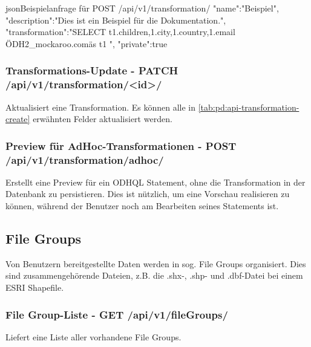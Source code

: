 \begin{srclst}{json}{Beispielanfrage für POST /api/v1/transformation/}
{
  "name":"Beispiel",
  "description":"Dies ist ein Beispiel für die Dokumentation.",
  "transformation":"SELECT t1.children,\nt1.city,\nt1.country,\nt1.email \nFROM \"ODH2_mockaroo.com\" as t1 \n",
  "private":true
}
\end{srclst}

\subsubsection{Transformations-Update - PATCH /api/v1/transformation/<id>/}
Aktualisiert eine Transformation. Es können alle in \cref{tab:pd:api-transformation-create} erwähnten Felder aktualisiert werden.

\subsubsection{Preview für AdHoc-Transformationen - POST /api/v1/transformation/adhoc/}
Erstellt eine Preview für ein ODHQL Statement, ohne die Transformation in der Datenbank zu persistieren. Dies ist nützlich, um eine Vorschau realisieren zu können, während der Benutzer noch am Bearbeiten seines Statements ist.

\subsection{File Groups}\label{sec:pd:api-filegroups}
Von Benutzern bereitgestellte Daten werden in sog. File Groups organisiert. Dies sind zusammengehörende Dateien, z.B. die .shx-, .shp- und .dbf-Datei bei einem ESRI Shapefile.

\subsubsection{File Group-Liste - GET /api/v1/fileGroups/}
Liefert eine Liste aller vorhandene File Groups.

